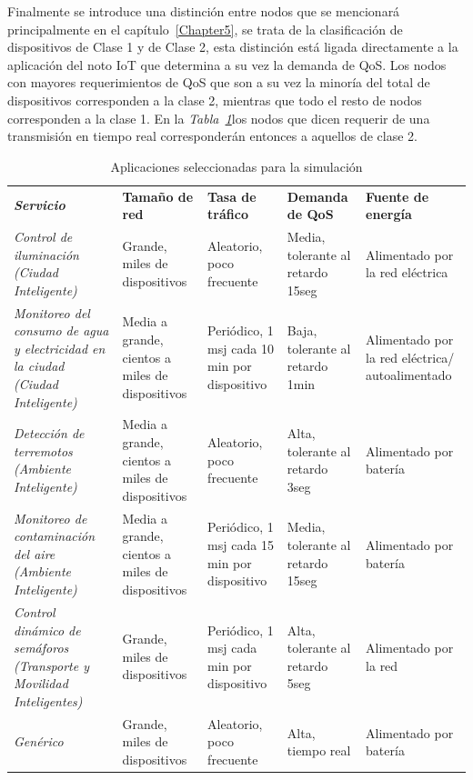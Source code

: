 Finalmente se introduce una distinción entre nodos que se mencionará principalmente en el capítulo~\ref{Chapter5}, se trata de la clasificación de dispositivos de Clase 1 y de Clase 2, esta distinción está ligada directamente a la aplicación del noto IoT que determina a su vez la demanda de QoS. Los nodos con mayores requerimientos de QoS que son a su vez la minoría del total de dispositivos corresponden a la clase 2, mientras que todo el resto de nodos corresponden a la clase 1. En la \textit{Tabla~\ref{tab:appssim}}los nodos que dicen requerir de una transmisión en tiempo real corresponderán entonces a aquellos de clase 2.\newline


\begin{table}
\caption{Aplicaciones seleccionadas para la simulación}
\label{tab:appssim}
\centering
\begin{tabular}{*{5}{m{3cm}}} \\ 
\textbf{\textit{Servicio}} & \textbf{Tamaño de red} & \textbf{Tasa de tráfico} & \textbf{Demanda de QoS} & \textbf{Fuente de energía} \\ 
\textit{Control de iluminación (Ciudad Inteligente)}  & \footnotesize{ Grande, miles de dispositivos } & \footnotesize{ Aleatorio, poco frecuente } & \footnotesize{ Media, tolerante al retardo 15seg } & \footnotesize{ Alimentado por la red eléctrica } \\ \hline 
\textit{Monitoreo del consumo de agua y electricidad en la ciudad (Ciudad Inteligente)}  & \footnotesize{ Media a grande, cientos a miles de dispositivos } & \footnotesize{ Periódico, 1 msj cada 10 min por dispositivo } & \footnotesize{ Baja, tolerante al retardo 1min } & \footnotesize{ Alimentado por la red eléctrica/ autoalimentado } \\ \hline 
\textit{Detección de terremotos (Ambiente Inteligente)}  & \footnotesize{ Media a grande, cientos a miles de dispositivos } & \footnotesize{ Aleatorio, poco frecuente } & \footnotesize{ Alta, tolerante al retardo 3seg } & \footnotesize{ Alimentado por batería } \\ \hline 
\textit{Monitoreo de contaminación del aire (Ambiente Inteligente) } & \footnotesize{ Media a grande, cientos a miles de dispositivos } & \footnotesize{ Periódico, 1 msj cada 15 min por dispositivo } & \footnotesize{ Media, tolerante al retardo 15seg } & \footnotesize{ Alimentado por batería } \\ \hline 
\textit{Control dinámico de semáforos (Transporte y Movilidad Inteligentes)} & \footnotesize{ Grande, miles de dispositivos } & \footnotesize{ Periódico, 1 msj cada min por dispositivo } & \footnotesize{ Alta, tolerante al retardo 5seg } & \footnotesize{ Alimentado por la red } \\ \hline 
\textit{Genérico}  & \footnotesize{ Grande, miles de dispositivos } & \footnotesize{ Aleatorio, poco frecuente } & \footnotesize{ Alta, tiempo real } & \footnotesize{ Alimentado por batería } \\ 
\end{tabular}
\end{table}

